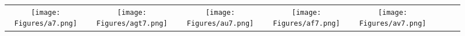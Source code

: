 \documentclass[journal]{IEEEtran}
\begin{document}
\begin{figure*}[!t]
	
	\begin{tabular}{cccccccc}
	    \begin{minipage}{32pt}
			\texttt{[image: Figures/a7.png]}
\end{minipage}
		&
		\hspace{0.4cm}
		\begin{minipage}{32pt}
			\texttt{[image: Figures/agt7.png]}
\end{minipage}
		&
		\hspace{0.4cm}
		\begin{minipage}{32pt}
			\texttt{[image: Figures/au7.png]}
\end{minipage}
		&
		\hspace{0.4cm}
		\begin{minipage}{32pt}
			\texttt{[image: Figures/af7.png]}
\end{minipage}
		&
		\hspace{0.4cm}
		\begin{minipage}{32pt}
			\texttt{[image: Figures/av7.png]}
\end{minipage}
		&
		

\end{tabular}
\end{figure*}
\end{document}
